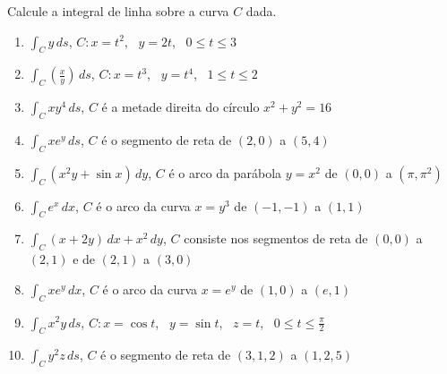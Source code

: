 \documentclass[a4paper, 12pt]{article}
\begin{document}
	
	
	\vspace{5mm}
	
	Calcule a integral de linha sobre a curva $C$ dada.
	
	\begin{enumerate}
		
		\item $\displaystyle \int_C y \, ds$, \quad $C: x = t^2$, \, $y = 2t$, \, $0 \leq t \leq 3$

		\item $\displaystyle \int_C \left(\frac{x}{y}\right) \, ds$, \quad $C: x = t^3$, \, $y = t^4$, \, $1 \leq t \leq 2$

		\item $\displaystyle \int_C xy^4 \, ds$, \quad $C$ é a metade direita do círculo $x^2 + y^2 = 16$

		\item $\displaystyle \int_C xe^y \, ds$, \quad $C$ é o segmento de reta de $(2,0)$ a $(5,4)$

		\item $\displaystyle \int_C (x^{2}y + \sin x) \, dy$, \quad $C$ é o arco da parábola $y = x^2$ de $(0,0)$ a $(\pi,\pi^2)$

		\item $\displaystyle \int_C e^x \, dx$, \quad $C$ é o arco da curva $x = y^3$ de $(-1,-1)$ a $(1,1)$

		\item $\displaystyle \int_C (x + 2y) \, dx + x^2 \, dy$, \quad $C$ consiste nos segmentos de reta de $(0,0)$ a $(2,1)$ e de $(2,1)$ a $(3,0)$

		\item $\displaystyle \int_C xe^y \, dx$, \quad $C$ é o arco da curva $x = e^y$ de $(1,0)$ a $(e,1)$

		\item $\displaystyle \int_C x^{2}y \, ds$, \quad $C: x = \cos t$, \, $y = \sin t$, \, $z = t$, \, $0 \leq t \leq \frac{\pi}{2}$

		\item $\displaystyle \int_C y^{2}z \, ds$, \quad $C$ é o segmento de reta de $(3,1,2)$ a $(1,2,5)$


\end{enumerate}
\end{document}
